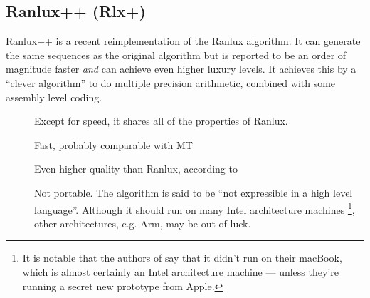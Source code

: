 \documentclass[letterpaper,12pt]{article}
\begin{document}
\subsection{Ranlux++ (Rlx+)}
Ranlux++ is a recent reimplementation of the Ranlux algorithm\cite{Sibidanov:Ranlux++}.
It can generate the same sequences as the original algorithm but is reported
to be an order of magnitude faster {\em and} can achieve even higher luxury
levels. It achieves this by a ``clever algorithm''
to do multiple precision arithmetic, combined with some assembly level
coding.
\begin{description}
\item[\GoodThing]
  Except for speed, it shares all of the properties of Ranlux.
\item[\GoodThing]
  Fast, probably comparable with MT
\item[\GoodThing]
  Even higher quality than Ranlux, according to\cite{James:HighQualityRNGs}
\item[\BadThing]
  Not portable. The algorithm is said to be ``not expressible in a high
  level language''. Although it should run on many Intel architecture
  machines%
  \footnote{
    It is notable that the authors of \cite{James:HighQualityRNGs} say that
    it didn't run on their macBook, which is almost certainly an Intel
    architecture machine --- unless they're running a
    secret new prototype from Apple.
    },
  other architectures, e.g. Arm, may be out of luck.
\end{description}

\end{document}
